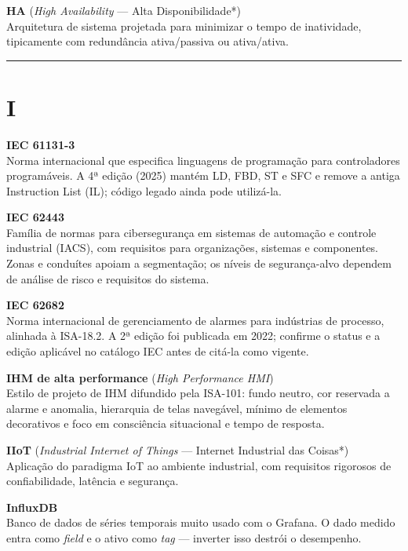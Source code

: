 \textbf{HA} (\emph{High Availability} --- Alta Disponibilidade*)\\
Arquitetura de sistema projetada para minimizar o tempo de inatividade, tipicamente com redundância ativa/passiva ou ativa/ativa.

\begin{center}\rule{0.5\linewidth}{0.5pt}\end{center}

\section{I}\label{i}

\textbf{IEC 61131-3}\\
Norma internacional que especifica linguagens de programação para controladores programáveis. A 4ª edição (2025) mantém LD, FBD, ST e SFC e remove a antiga Instruction List (IL); código legado ainda pode utilizá-la.

\textbf{IEC 62443}\\
Família de normas para cibersegurança em sistemas de automação e controle industrial (IACS), com requisitos para organizações, sistemas e componentes. Zonas e conduítes apoiam a segmentação; os níveis de segurança-alvo dependem de análise de risco e requisitos do sistema.

\textbf{IEC 62682}\\
Norma internacional de gerenciamento de alarmes para indústrias de processo, alinhada à ISA-18.2. A 2ª edição foi publicada em 2022; confirme o status e a edição aplicável no catálogo IEC antes de citá-la como vigente.

\textbf{IHM de alta performance} (\emph{High Performance HMI})\\
Estilo de projeto de IHM difundido pela ISA-101: fundo neutro, cor reservada a alarme e anomalia, hierarquia de telas navegável, mínimo de elementos decorativos e foco em consciência situacional e tempo de resposta.

\textbf{IIoT} (\emph{Industrial Internet of Things} --- Internet Industrial das Coisas*)\\
Aplicação do paradigma IoT ao ambiente industrial, com requisitos rigorosos de confiabilidade, latência e segurança.

\textbf{InfluxDB}\\
Banco de dados de séries temporais muito usado com o Grafana. O dado medido entra como \emph{field} e o ativo como \emph{tag} --- inverter isso destrói o desempenho.

